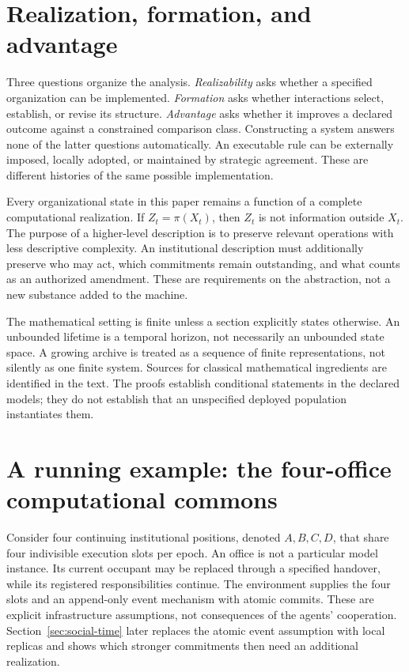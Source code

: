 \documentclass[11pt,letterpaper]{article}
\theoremstyle{plain}
\theoremstyle{definition}
\theoremstyle{remark}
\begin{document}
\section{Realization, formation, and advantage}\label{sec:scope}
Three questions organize the analysis. \emph{Realizability} asks whether a specified organization can be implemented. \emph{Formation} asks whether interactions select, establish, or revise its structure. \emph{Advantage} asks whether it improves a declared outcome against a constrained comparison class. Constructing a system answers none of the latter questions automatically. An executable rule can be externally imposed, locally adopted, or maintained by strategic agreement. These are different histories of the same possible implementation.

Every organizational state in this paper remains a function of a complete computational realization. If $Z_t=\pi(X_t)$, then $Z_t$ is not information outside $X_t$. The purpose of a higher-level description is to preserve relevant operations with less descriptive complexity. An institutional description must additionally preserve who may act, which commitments remain outstanding, and what counts as an authorized amendment. These are requirements on the abstraction, not a new substance added to the machine.

The mathematical setting is finite unless a section explicitly states otherwise. An unbounded lifetime is a temporal horizon, not necessarily an unbounded state space. A growing archive is treated as a sequence of finite representations, not silently as one finite system. Sources for classical mathematical ingredients are identified in the text. The proofs establish conditional statements in the declared models; they do not establish that an unspecified deployed population instantiates them.


\section{A running example: the four-office computational commons}\label{sec:commons}
Consider four continuing institutional positions, denoted $A,B,C,D$, that share four indivisible execution slots per epoch. An office is not a particular model instance. Its current occupant may be replaced through a specified handover, while its registered responsibilities continue. The environment supplies the four slots and an append-only event mechanism with atomic commits. These are explicit infrastructure assumptions, not consequences of the agents' cooperation. Section~\ref{sec:social-time} later replaces the atomic event assumption with local replicas and shows which stronger commitments then need an additional realization.
\end{document}
